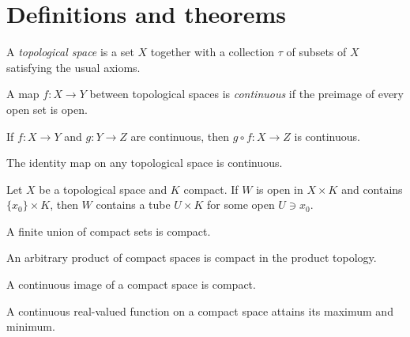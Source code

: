 \documentclass{article}
\theoremstyle{mytheoremstyle}{\newtheorem{definition}{Definition}[section]}
\theoremstyle{mytheoremstyle}{\newtheorem{proposition}[definition]{Proposition}}
\theoremstyle{mytheoremstyle}{\newtheorem{theorem}[definition]{Theorem}}
\theoremstyle{mytheoremstyle}{\newtheorem{lemma}[definition]{Lemma}}
\theoremstyle{mytheoremstyle}{\newtheorem{corollary}[definition]{Corollary}}
\begin{document}
\section{Definitions and theorems}

\begin{definition}
  A \emph{topological space} is a set $X$ together with a collection $\tau$
  of subsets of $X$ satisfying the usual axioms.
\end{definition}

\begin{definition}
  \label{def:continuous}
  A map $f \colon X \to Y$ between topological spaces is \emph{continuous}
  if the preimage of every open set is open.
\end{definition}

\begin{proposition}
  If $f \colon X \to Y$ and $g \colon Y \to Z$ are continuous, then
  $g \circ f \colon X \to Z$ is continuous.
\end{proposition}

\begin{proposition}
  \label{prop:unnamed}
  The identity map on any topological space is continuous.
\end{proposition}

\begin{lemma}
  Let $X$ be a topological space and $K$ compact. If $W$ is open in
  $X \times K$ and contains $\{x_0\} \times K$, then $W$ contains a tube
  $U \times K$ for some open $U \ni x_0$.
\end{lemma}

\begin{lemma}
  \label{lem:unnamed}
  A finite union of compact sets is compact.
\end{lemma}

\begin{theorem}
  An arbitrary product of compact spaces is compact in the product topology.
\end{theorem}

\begin{theorem}
  \label{thm:unnamed}
  A continuous image of a compact space is compact.
\end{theorem}

\begin{corollary}
  A continuous real-valued function on a compact space attains its maximum
  and minimum.
\end{corollary}
\end{document}
